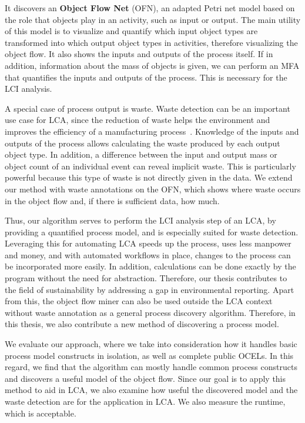 It discovers an \textbf{Object Flow Net} (OFN), an adapted Petri net model based on the role that objects play in an activity, such as input or output.
The main utility of this model is to visualize and quantify which input object types are transformed into which output object types in activities, therefore visualizing the object flow.
It also shows the inputs and outputs of the process itself.
If in addition, information about the mass of objects is given, we can perform an MFA that quantifies the inputs and outputs of the process.
This is necessary for the LCI analysis.



A special case of process output is waste.
Waste detection can be an important use case for LCA, since the reduction of waste helps the environment and improves the efficiency of a manufacturing process~\autocite{barrionuevo2025}.
Knowledge of the inputs and outputs of the process allows calculating the waste produced by each output object type.
In addition, a difference between the input and output mass or object count of an individual event can reveal implicit waste.
This is particularly powerful because this type of waste is not directly given in the data.
We extend our method with waste annotations on the OFN, which shows where waste occurs in the object flow and, if there is sufficient data, how much.



Thus, our algorithm serves to perform the LCI analysis step of an LCA, by providing a quantified process model, and is especially suited for waste detection.
Leveraging this for automating LCA speeds up the process, uses less manpower and money, and with automated workflows in place, changes to the process can be incorporated more easily.
In addition, calculations can be done exactly by the program without the need for abstraction.
Therefore, our thesis contributes to the field of sustainability by addressing a gap in environmental reporting.
Apart from this, the object flow miner can also be used outside the LCA context without waste annotation as a general process discovery algorithm.
Therefore, in this thesis, we also contribute a new method of discovering a process model.


We evaluate our approach, where we take into consideration how it handles basic process model constructs in isolation, as well as complete public OCELs.
In this regard, we find that the algorithm can mostly handle common process constructs and discovers a useful model of the object flow.
Since our goal is to apply this method to aid in LCA, we also examine how useful the discovered model and the waste detection are for the application in LCA.
We also measure the runtime, which is acceptable.




